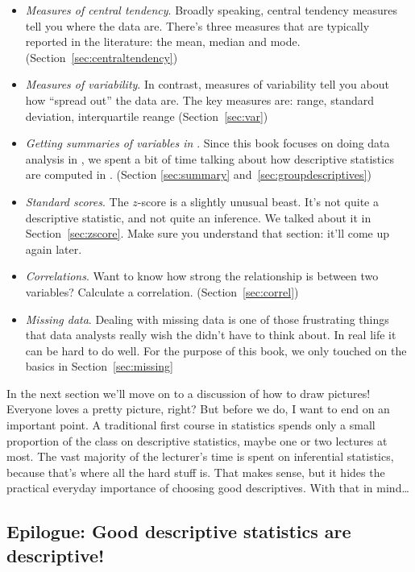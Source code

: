 \begin{itemize}
\item {\it Measures of central tendency}. Broadly speaking, central tendency measures tell you where the data are. There's three measures that are typically reported in the literature: the mean, median and mode. (Section~\ref{sec:centraltendency})
\item {\it Measures of variability}. In contrast, measures of variability tell you about how ``spread out'' the data are. The key measures are: range, standard deviation, interquartile reange (Section~\ref{sec:var})
\item {\it Getting summaries of variables in \R}. Since this book focuses on doing data analysis in \R, we spent a bit of time talking about how descriptive statistics are computed in \R. (Section \ref{sec:summary} and~\ref{sec:groupdescriptives})
\item {\it Standard scores}. The $z$-score is a slightly unusual beast. It's not quite a descriptive statistic, and not quite an inference. We talked about it in Section~\ref{sec:zscore}. Make sure you understand that section: it'll come up again later. 
\item {\it Correlations}. Want to know how strong the relationship is between two variables? Calculate a correlation. (Section~\ref{sec:correl})
\item {\it Missing data}. Dealing with missing data is one of those frustrating things that data analysts really wish the didn't have to think about. In real life it can be hard to do well. For the purpose of this book, we only touched on the basics in Section~\ref{sec:missing}
\end{itemize}
In the next section we'll move on to a discussion of how to draw pictures! Everyone loves a pretty picture, right? But before we do, I want to end on an important point. A traditional first course in statistics spends only a small proportion of the class on descriptive statistics, maybe one or two lectures at most. The vast majority of the lecturer's time is spent on inferential statistics, because that's where all the hard stuff is. That makes sense, but it hides the practical everyday importance of choosing good descriptives. With that in mind\ldots

\subsection{Epilogue: Good descriptive statistics are descriptive!}

